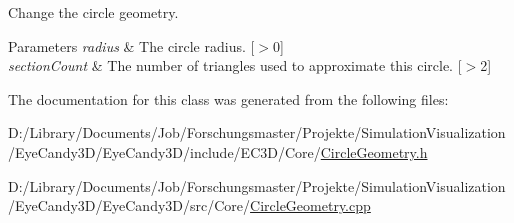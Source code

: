 Change the circle geometry. 


\begin{DoxyParams}{Parameters}
{\em radius} & The circle radius. \mbox{[}$>$0\mbox{]} \\
\hline
{\em section\+Count} & The number of triangles used to approximate this circle. \mbox{[}$>$2\mbox{]} \\
\hline
\end{DoxyParams}


The documentation for this class was generated from the following files\+:\begin{DoxyCompactItemize}
\item 
D\+:/\+Library/\+Documents/\+Job/\+Forschungsmaster/\+Projekte/\+Simulation\+Visualization/\+Eye\+Candy3\+D/\+Eye\+Candy3\+D/include/\+E\+C3\+D/\+Core/\mbox{\hyperlink{_circle_geometry_8h}{Circle\+Geometry.\+h}}\item 
D\+:/\+Library/\+Documents/\+Job/\+Forschungsmaster/\+Projekte/\+Simulation\+Visualization/\+Eye\+Candy3\+D/\+Eye\+Candy3\+D/src/\+Core/\mbox{\hyperlink{_circle_geometry_8cpp}{Circle\+Geometry.\+cpp}}\end{DoxyCompactItemize}

